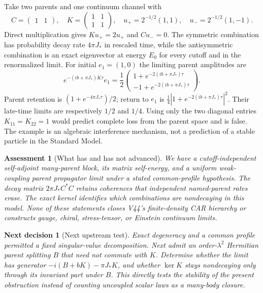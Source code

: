 \documentclass[11pt]{article}
\newtheorem{decision}[theorem]{Next decision}
\newtheorem{assessment}[theorem]{Assessment}
\theoremstyle{remark}
\begin{document}
Take two parents and one continuum channel with
\[
 C=\begin{pmatrix}1&1\end{pmatrix},\quad
 K=\begin{pmatrix}1&1\\1&1\end{pmatrix},\quad
 u_+=2^{-1/2}(1,1),\quad u_-=2^{-1/2}(1,-1).
\]
Direct multiplication gives \(Ku_+=2u_+\) and \(Cu_-=0\).
The symmetric combination has probability decay rate
\(4\pi J_*\) in rescaled time, while the antisymmetric
combination is an exact eigenvector at energy \(E_0\) for every
cutoff and in the renormalized limit.  For initial \(e_1=(1,0)\)
the limiting parent amplitudes are
\[
 e^{-(ib+\pi J_*)K\tau}e_1
 =\frac12
 \begin{pmatrix}
  1+e^{-2(ib+\pi J_*)\tau}\\
 -1+e^{-2(ib+\pi J_*)\tau}
 \end{pmatrix}.
\]
Parent retention is \((1+e^{-4\pi J_*\tau})/2\);
return to \(e_1\) is
\(\tfrac14|1+e^{-2(ib+\pi J_*)\tau}|^2\).
Their late-time limits are respectively \(1/2\) and \(1/4\).
Using only the two diagonal entries \(K_{11}=K_{22}=1\)
would predict complete loss from the parent space and is false.
The example is an algebraic interference mechanism, not a
prediction of a stable particle in the Standard Model.

\begin{assessment}[What has and has not advanced]
\label{ass:v20v52}
We have a cutoff-independent self-adjoint many-parent block,
its matrix self-energy, and a uniform weak-coupling parent
propagator limit under a stated common-profile hypothesis.
The decay matrix \(2\pi J_*C^*C\) retains coherences that
independent named-parent rates erase.  The exact kernel identifies
which combinations are nondecaying in this model.  None of these
statements closes V44's finite-density CAR hierarchy or constructs
gauge, chiral, stress-tensor, or Einstein continuum limits.
\end{assessment}

\begin{decision}[Next upstream test]
\label{dec:v20v52-next}
Exact degeneracy and a common profile permitted a fixed
singular-value decomposition.  Next admit an order-\(\lambda^2\)
Hermitian parent splitting \(B\) that need not commute with \(K\).
Determine whether the limit has generator
\(-i(B+bK)-\pi J_*K\), and whether \(\ker K\) stays nondecaying
only through its invariant part under \(B\).  This directly tests
the stability of the present obstruction instead of counting
uncoupled scalar laws as a many-body closure.
\end{decision}
\end{document}
